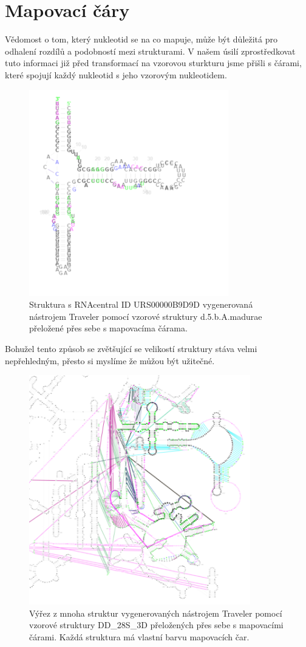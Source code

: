 \section{Mapovací čáry}

Vědomost o tom, který nukleotid se na co mapuje, může být důležitá pro odhalení
rozdílů a podobností mezi strukturami. V našem úsilí zprostředkovat tuto
informaci již před transformací na vzorovou sturkturu jsme přišli s čárami,
které spojují každý nukleotid s jeho vzorovým nukleotidem.

\begin{figure}[H]
  \centering
  \includegraphics[height=90mm]{../img/kap02/mappingLines/small.png}
  \caption{Struktura s RNAcentral ID URS00000B9D9D vygenerovaná nástrojem
  Traveler pomocí vzorové struktury d.5.b.A.madurae přeložené přes sebe s
  mapovacíma čárama.}
\end{figure}

Bohužel tento způsob se zvětšující se velikostí struktury stáva velmi
nepřehledným, přesto si myslíme že můžou být užitečné.

\begin{figure}[H]
  \centering
  \includegraphics[height=100mm]{../img/kap02/mappingLines/big.png}
  \caption{Výřez z mnoha struktur vygenerovaných nástrojem Traveler pomocí vzorové struktury DD\_28S\_3D přeložených přes sebe s mapovacími čárami.
  Každá struktura má vlastní barvu mapovacích čar.}
\end{figure}

